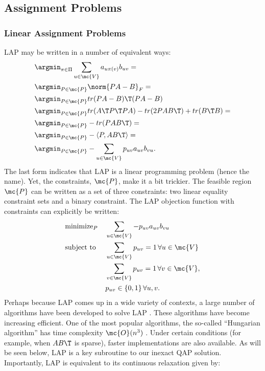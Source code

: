 \documentclass[10pt,journal,cspaper,compsoc]{IEEEtran}
\newcommand{\PmcP}{P \in \mc{P}}
\begin{document}
\subsection{Assignment Problems} %
\label{sub:assignment_problems}

\subsubsection{Linear Assignment Problems} %
\label{ssub:linear_assignment_problems}


LAP may be written in a number of equivalent ways:
\begin{align}
	 &\argmin_{\pi \in \Pi} \sum_{u \in \mc{V}} a_{u \pi(v)} b_{uv} =\nonumber\\
	&\argmin_{\PmcP} \norm{PA - B}_F =\nonumber\\
	&\argmin_{\PmcP} tr(PA-B)\T (PA-B) \nonumber\\ 
	&\argmin_{\PmcP} tr (A\T P\T PA) - tr(2PAB\T) + tr(B\T B)=\nonumber\\ 
	&\argmin_{\PmcP}  -tr (P AB\T) =\nonumber\\
	&\argmin_{\PmcP}  -\langle P, AB\T \rangle =\nonumber\\
	&\argmin_{\PmcP}  -\sum_{u \in \mc{V}} p_{uv} a_{uv} b_{vu}. \label{eq:LAP}
\end{align}
The last form indicates that LAP is a linear programming problem (hence the name).  Yet, the constraints, $\mc{P}$, make it a bit trickier.  The feasible region $\mc{P}$ can be written as a set of three constraints: two linear equality constraint sets and a binary constraint.  The LAP objection function with constraints can explicitly be written:
\begin{align}
		&\text{minimize}_P  &&\sum_{u \in \mc{V}} -p_{uv} a_{uv} b_{vu} \nonumber \\
		&\text{subject to } && \sum_{u \in \mc{V}} p_{uv} = 1 \, \forall u \in \mc{V} \nonumber \\
		& && \sum_{v \in \mc{V}} p_{uv} = 1 \, \forall v \in \mc{V}, \nonumber \\
		& &&p_{uv} \in \{0,1\} \, \forall u,v. \label{eq:LAP2}	
\end{align}
Perhaps because LAP comes up in a wide variety of contexts, a large number of algorithms have been developed to solve LAP \cite{Burkard2009}.  These algorithms have become increasing efficient.  One of the most popular algorithms, the so-called ``Hungarian algorithm'' has time complexity $\mc{O}(n^3)$ \cite{Jonker1987}.  Under certain conditions (for example, when $AB\T$ is sparse), faster implementations are also available.  As will be seen below, LAP is a key subroutine to our inexact QAP solution.  Importantly, LAP is equivalent to its continuous relaxation given by:
\end{document}
